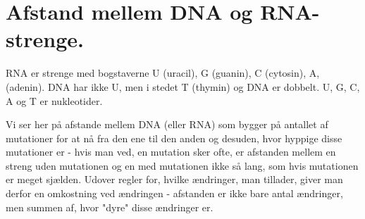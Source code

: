 \documentclass[a4paper, 12pt]{article}
\theoremstyle{remark}
\begin{document}
\section{ Afstand mellem DNA og RNA-strenge.} 
RNA er strenge med bogstaverne U (uracil), G (guanin), C (cytosin), A, (adenin). DNA har ikke U, men i stedet T (thymin) og DNA er dobbelt. U, G, C, A og T er nukleotider. 

Vi ser her på afstande mellem DNA (eller RNA) som bygger på antallet af mutationer for at nå fra den ene til den anden og desuden, hvor hyppige disse mutationer er - hvis man ved, en mutation sker ofte, er afstanden mellem en streng uden mutationen og en med mutationen ikke så lang, som hvis mutationen er meget sjælden. 
 Udover regler for, hvilke ændringer, man tillader, giver man derfor en omkostning ved ændringen - afstanden er ikke bare antal ændringer, men summen af, hvor "dyre" disse ændringer er.
\end{document}
